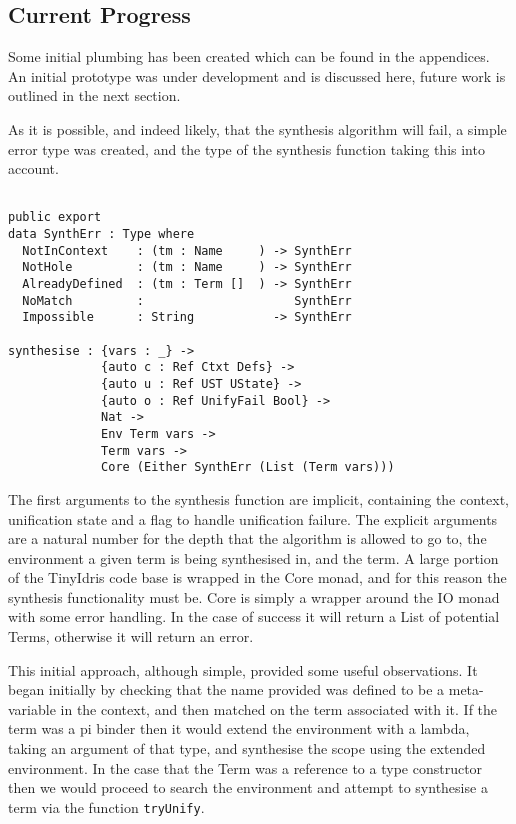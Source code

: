 \documentclass[a4paper]{article}
\begin{document}
\subsection{Current Progress}
\label{sec:org23f9a23}
Some initial plumbing has been created which can be found in the appendices. An initial prototype was under development 
and is discussed here, future work is outlined in the next section. 

As it is possible, and indeed likely, that the synthesis algorithm will fail, a simple 
error type was created, and the type of the synthesis function taking this into account. 

\begin{center}
\begin{verbatim}

public export
data SynthErr : Type where
  NotInContext    : (tm : Name     ) -> SynthErr 
  NotHole         : (tm : Name     ) -> SynthErr
  AlreadyDefined  : (tm : Term []  ) -> SynthErr
  NoMatch         :                     SynthErr
  Impossible      : String           -> SynthErr

synthesise : {vars : _} -> 
			 {auto c : Ref Ctxt Defs} ->
			 {auto u : Ref UST UState} ->  
			 {auto o : Ref UnifyFail Bool} ->
			 Nat ->
			 Env Term vars -> 
			 Term vars ->
			 Core (Either SynthErr (List (Term vars)))

\end{verbatim}
\end{center}

The first arguments to the synthesis function are implicit, containing the context, unification state and a flag to handle unification failure. 
The explicit arguments are a natural number for the depth that the algorithm is allowed to go to,
the environment a given term is being synthesised in, and the term. A large portion of the TinyIdris code base is 
wrapped in the Core monad, and for this reason the synthesis functionality must be. Core is simply a wrapper around 
the IO monad with some error handling. In the case of success it will return a List of potential Terms, otherwise it will return an error.   

This initial approach, although simple, provided some useful observations. It began initially 
by checking that the name provided was defined to be a meta-variable in the context, and then matched on the term associated
with it. If the term was a pi binder then it would extend the environment with a lambda, taking an argument of that type, and synthesise the 
scope using the extended environment. In the case that the Term was a reference to a type constructor then we would proceed
to search the environment and attempt to synthesise a term via the function \texttt{tryUnify}. 
\end{document}

